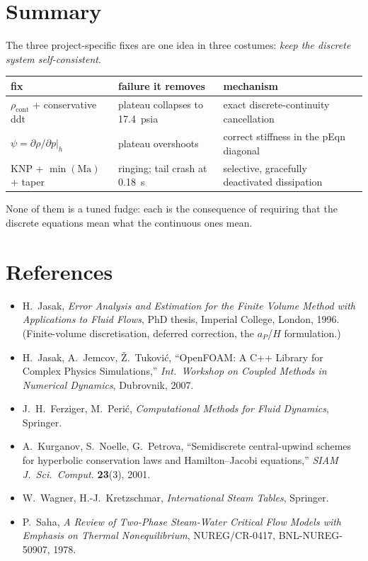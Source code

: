 \documentclass[11pt,a4paper]{article}
\newcommand{\rhocont}{\rho_{\mathrm{cont}}}
\begin{document}
\section{Summary}

The three project-specific fixes are one idea in three costumes: \emph{keep the
discrete system self-consistent}.

\begin{center}
\begin{tabular}{@{}lll@{}}
\toprule
\textbf{fix} & \textbf{failure it removes} & \textbf{mechanism} \\
\midrule
$\rhocont$ + conservative ddt & plateau collapses to \SI{17.4}{psia} & exact discrete-continuity cancellation \\
$\psi = \partial\rho/\partial p|_h$ & plateau overshoots & correct stiffness in the pEqn diagonal \\
KNP + $\min(\mathrm{Ma})$ + taper & ringing; tail crash at \SI{0.18}{\second} & selective, gracefully deactivated dissipation \\
\bottomrule
\end{tabular}
\end{center}

\noindent None of them is a tuned fudge: each is the consequence of requiring
that the discrete equations mean what the continuous ones mean.

\section*{References}

\begin{itemize}[leftmargin=*]
  \item H.~Jasak, \emph{Error Analysis and Estimation for the Finite Volume
        Method with Applications to Fluid Flows}, PhD thesis, Imperial College,
        London, 1996. (Finite-volume discretisation, deferred correction, the
        $a_P$/$H$ formulation.)
  \item H.~Jasak, A.~Jemcov, \v{Z}.~Tukovi\'{c}, ``OpenFOAM: A C++ Library for
        Complex Physics Simulations,'' \emph{Int.\ Workshop on Coupled Methods in
        Numerical Dynamics}, Dubrovnik, 2007.
  \item J.~H.~Ferziger, M.~Peri\'{c}, \emph{Computational Methods for Fluid
        Dynamics}, Springer.
  \item A.~Kurganov, S.~Noelle, G.~Petrova, ``Semidiscrete central-upwind schemes
        for hyperbolic conservation laws and Hamilton--Jacobi equations,''
        \emph{SIAM J.\ Sci.\ Comput.} \textbf{23}(3), 2001.
  \item W.~Wagner, H.-J.~Kretzschmar, \emph{International Steam Tables}, Springer.
  \item P.~Saha, \emph{A Review of Two-Phase Steam-Water Critical Flow Models
        with Emphasis on Thermal Nonequilibrium}, NUREG/CR-0417, BNL-NUREG-50907,
        1978.
\end{itemize}
\end{document}
